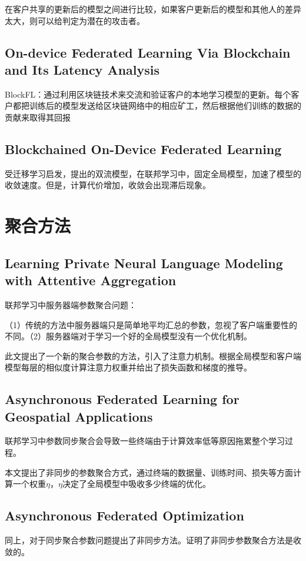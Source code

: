 \documentclass[12pt, a4paper]{article}
\begin{document}
            在客户共享的更新后的模型之间进行比较，如果客户更新后的模型和其他人的差异太大，则可以给判定为潜在的攻击者。
        \subsection*{On-device Federated Learning Via Blockchain and Its Latency Analysis}
            BlockFL：通过利用区块链技术来交流和验证客户的本地学习模型的更新。每个客户都把训练后的模型发送给区块链网络中的相应矿工，然后根据他们训练的数据的贡献来取得其回报
        \subsection*{Blockchained On-Device Federated Learning\cite{kim2019blockchained}}
            受迁移学习启发，提出的双流模型，在联邦学习中，固定全局模型，加速了模型的收敛速度。但是，计算代价增加，收敛会出现滞后现象。

    \section*{聚合方法}
        \subsection*{Learning Private Neural Language Modeling with Attentive Aggregation}
            联邦学习中服务器端参数聚合问题：

            （1）传统的方法中服务器端只是简单地平均汇总的参数，忽视了客户端重要性的不同。（2）服务器端对于学习一个好的全局模型没有一个优化机制。

            此文提出了一个新的聚合参数的方法，引入了注意力机制。根据全局模型和客户端模型每层的相似度计算注意力权重并给出了损失函数和梯度的推导。
        \subsection*{Asynchronous Federated Learning for Geospatial Applications}
            联邦学习中参数同步聚合会导致一些终端由于计算效率低等原因拖累整个学习过程。

            本文提出了非同步的参数聚合方式，通过终端的数据量、训练时间、损失等方面计算一个权重$ \eta $，$ \eta $决定了全局模型中吸收多少终端的优化。

        \subsection*{Asynchronous Federated Optimization}
            同上，对于同步聚合参数问题提出了非同步方法。证明了非同步参数聚合方法是收敛的。
\end{document}
